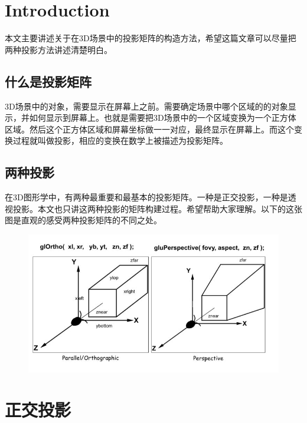 \documentclass{article} \usepackage{braket} \usepackage{amsmath,amssymb} \usepackage{geometry} \usepackage{graphicx} \usepackage{braket} \usepackage{bm}\usepackage{hyperref} \usepackage{CJKutf8}
\begin{document}
\begin{CJK}{UTF8}{gbsn}


  \section{Introduction}

  本文主要讲述关于在3D场景中的投影矩阵的构造方法，希望这篇文章可以尽量把两种投影方法讲述清楚明白。

  \subsection{什么是投影矩阵}

  3D场景中的对象，需要显示在屏幕上之前。需要确定场景中哪个区域的的对象显示，并如何显示到屏幕上。也就是需要把3D场景中的一个区域变换为一个正方体区域。然后这个正方体区域和屏幕坐标做一一对应，最终显示在屏幕上。而这个变换过程就叫做投影，相应的变换在数学上被描述为投影矩阵。

  \subsection{两种投影}

  在3D图形学中，有两种最重要和最基本的投影矩阵。一种是正交投影，一种是透视投影。本文也只讲这两种投影的矩阵构建过程。希望帮助大家理解。以下的这张图是直观的感受两种投影矩阵的不同之处。

  \begin{figure}[htbp]
    \centering
    \includegraphics[width=1.0\linewidth]{pic-1.jpg}
  \end{figure}	

  \section{正交投影}


\end{CJK}
\end{document}
